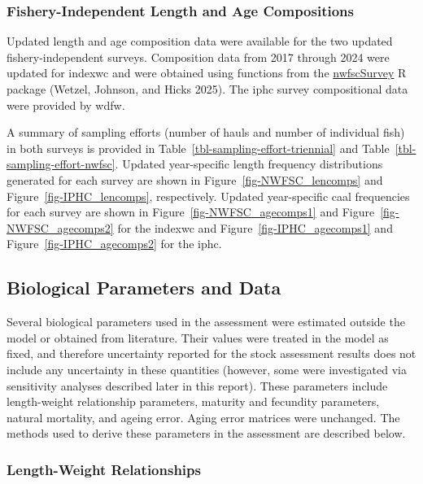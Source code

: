 \documentclass[
]{scrartcl}
\begin{document}
\subsubsection{Fishery-Independent Length and Age
Compositions}\label{fishery-independent-length-and-age-compositions}

Updated length and age composition data were available for the two
updated fishery-independent surveys. Composition data from 2017 through
2024 were updated for \gls{indexwc} and were obtained using functions
from the
\href{https://github.com/pfmc-assessments/nwfscSurvey}{nwfscSurvey} R
package (Wetzel, Johnson, and Hicks 2025). The \gls{iphc} survey
compositional data were provided by \gls{wdfw}.

A summary of sampling efforts (number of hauls and number of individual
fish) in both surveys is provided in
Table~\ref{tbl-sampling-effort-triennial} and
Table~\ref{tbl-sampling-effort-nwfsc}. Updated year-specific length
frequency distributions generated for each survey are shown in
Figure~\ref{fig-NWFSC_lencomps} and Figure~\ref{fig-IPHC_lencomps},
respectively. Updated year-specific \gls{caal} frequencies for each
survey are shown in Figure~\ref{fig-NWFSC_agecomps1} and
Figure~\ref{fig-NWFSC_agecomps2} for the \gls{indexwc} and
Figure~\ref{fig-IPHC_agecomps1} and Figure~\ref{fig-IPHC_agecomps2} for
the \gls{iphc}.

\subsection{Biological Parameters and
Data}\label{biological-parameters-and-data}

Several biological parameters used in the assessment were estimated
outside the model or obtained from literature. Their values were treated
in the model as fixed, and therefore uncertainty reported for the stock
assessment results does not include any uncertainty in these quantities
(however, some were investigated via sensitivity analyses described
later in this report). These parameters include length-weight
relationship parameters, maturity and fecundity parameters, natural
mortality, and ageing error. Aging error matrices were unchanged. The
methods used to derive these parameters in the assessment are described
below.

\subsubsection{Length-Weight
Relationships}\label{length-weight-relationships}
\end{document}
